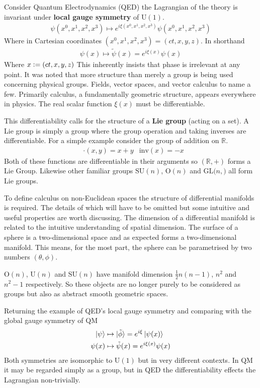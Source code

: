 \documentclass[floatfix,aps,prd,amsmath,amssymb]{revtex4}
\begin{document}
Consider Quantum Electrodynamics (QED) the Lagrangian of the theory is invariant under \textbf{local gauge symmetry} of $\mathrm{U}(1)$.
\begin{align*}
\psi(x^0,x^1,x^2,x^3) \mapsto e^{i \xi(x^0,x^1,x^2,x^3)} \psi(x^0,x^1,x^2,x^3)
\end{align*}
Where in Cartesian coordinates $(x^0,x^1,x^2,x^3)=(ct,x,y,z)$. In shorthand
\begin{align*}
\psi(x) \mapsto  \tilde{\psi}(x)=e^{i \xi(x)} \psi(x)
\end{align*}
Where $x\vcentcolon=(ct,x,y,z)$ This inherently insists that phase is irrelevant at any point. It was noted that more structure than merely a group is being used  concerning physical groups. Fields, vector spaces, and vector calculus to name a few. Primarily calculus, a fundamentally geometric structure, appears everywhere in physics. The real scalar function $\xi(x)$ must be differentiable.

This differentiability calls for the structure of a \textbf{Lie group} (acting on a set). A Lie group is simply a group where the group operation and taking inverses are differentiable. For a simple example consider the group of addition on $\mathbb{R}$.
\begin{align*}
&\cdot(x,y) = x+y &\mathrm{inv}(x) = -x
\end{align*}
Both of these functions are differentiable in their arguments so $(\mathbb{R},+)$ forms a Lie Group. Likewise other familiar groups $\mathrm{SU}(n)$, $\mathrm{O}(n)$ and $\mathrm{GL}(n,\mathrm)$ all form Lie groups.

To define calculus on non-Euclidean spaces the structure of differential manifolds is required. The details of which will have to be omitted but some intuitive and useful properties are worth discussing. The dimension of a differential manifold is related to the intuitive understanding of spatial dimension. The surface of a sphere is a two-dimensional space and as expected forms a two-dimensional manifold. This means, for the most part, the sphere can be parametrised by two numbers $(\theta,\phi)$.

$\mathrm{O}(n)$, $\mathrm{U}(n)$ and $\mathrm{SU}(n)$ have manifold dimension $\frac{1}{2}n(n-1)$, $n^2$ and $n^2-1$ respectively. So these objects are no longer purely to be considered as groups but also as abstract smooth geometric spaces.

Returning the example of QED's local gauge symmetry and comparing with the global gauge symmetry of QM
\begin{align*}
\ket{\psi} &\mapsto  \ket{\tilde{\phi}}=e^{i \xi} \ket{\psi(x)} \\
\psi(x) &\mapsto  \tilde{\psi}(x)=e^{i \xi(x)} \psi(x)
\end{align*}
Both symmetries are isomorphic to $\mathrm{U}(1)$ but in very different contexts. In QM it may be regarded simply as a group, but in QED the differentiability effects the Lagrangian non-trivially.
\end{document}
